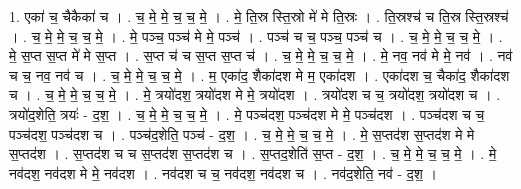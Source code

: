 \documentclass[17pt]{extarticle}
\begin{document}
1. एका॑ च॒ चैकैका॑ च । . च॒ मे॒ मे॒ च॒ च॒ मे॒ । . मे॒ ति॒स्र स्ति॒स्रो मे॑ मे ति॒स्रः । . ति॒स्रश्च॑ च ति॒स्र स्ति॒स्रश्च॑ । . च॒ मे॒ मे॒ च॒ च॒ मे॒ । . मे॒ पञ्च॒ पञ्च॑ मे मे॒ पञ्च॑ । . पञ्च॑ च च॒ पञ्च॒ पञ्च॑ च । . च॒ मे॒ मे॒ च॒ च॒ मे॒ । . मे॒ स॒प्त स॒प्त मे॑ मे स॒प्त । . स॒प्त च॑ च स॒प्त स॒प्त च॑ । . च॒ मे॒ मे॒ च॒ च॒ मे॒ । . मे॒ नव॒ नव॑ मे मे॒ नव॑ । . नव॑ च च॒ नव॒ नव॑ च । . च॒ मे॒ मे॒ च॒ च॒ मे॒ । . म॒ एका॑द॒ शैका॑दश मे म॒ एका॑दश । . एका॑दश च॒ चैका॑द॒ शैका॑दश च । . च॒ मे॒ मे॒ च॒ च॒ मे॒ । . मे॒ त्रयो॑दश॒ त्रयो॑दश मे मे॒ त्रयो॑दश । . त्रयो॑दश च च॒ त्रयो॑दश॒ त्रयो॑दश च । . त्रयो॑द॒शेति॒ त्रयः॑ - द॒श॒ । . च॒ मे॒ मे॒ च॒ च॒ मे॒ । . मे॒ पञ्च॑दश॒ पञ्च॑दश मे मे॒ पञ्च॑दश । . पञ्च॑दश च च॒ पञ्च॑दश॒ पञ्च॑दश च । . पञ्च॑द॒शेति॒ पञ्च॑ - द॒श॒ । . च॒ मे॒ मे॒ च॒ च॒ मे॒ । . मे॒ स॒प्तद॑श स॒प्तद॑श मे मे स॒प्तद॑श । . स॒प्तद॑श च च स॒प्तद॑श स॒प्तद॑श च । . स॒प्तद॒शेति॑ स॒प्त - द॒श॒ । . च॒ मे॒ मे॒ च॒ च॒ मे॒ । . मे॒ नव॑दश॒ नव॑दश मे मे॒ नव॑दश । . नव॑दश च च॒ नव॑दश॒ नव॑दश च । . नव॑द॒शेति॒ नव॑ - द॒श॒ । \newline
\end{document}
